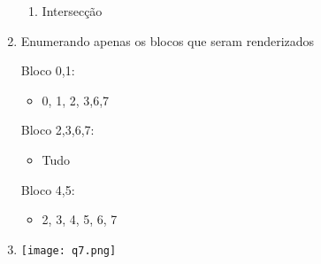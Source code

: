 \begin{enumerate}[label=\arabic*)]
\begin{enumerate}[label=\alph*)]
			\item Intersecção	
		\end{enumerate}				
		
		\newpage

		\item Enumerando apenas os blocos que seram renderizados

		Bloco 0,1:
		\begin{itemize}
			\item 0, 1, 2, 3,6,7
		\end{itemize}

		Bloco 2,3,6,7:
		\begin{itemize}
			\item Tudo
		\end{itemize}

		Bloco 4,5:
		\begin{itemize}
			\item 2, 3, 4, 5, 6, 7
		\end{itemize}
		
		\item 

		\begin{minipage}{\linewidth}
			\centering 
			\texttt{[image: q7.png]}
		\end{minipage}
	\end{enumerate}
